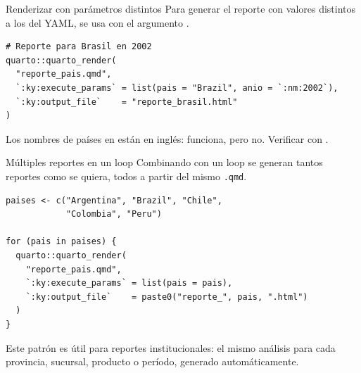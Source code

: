 \documentclass[8pt]{beamer}
\begin{document}
	\begin{frame}[fragile]{Renderizar con parámetros distintos}
		Para generar el reporte con valores distintos a los del YAML, se usa  con el argumento .

\begin{lstlisting}[style=RScript]
# Reporte para Brasil en 2002
quarto::quarto_render(
  "reporte_pais.qmd",
  `:ky:execute_params` = list(pais = "Brazil", anio = `:nm:2002`),
  `:ky:output_file`    = "reporte_brasil.html"
)
\end{lstlisting}

		\begin{alertblock}{}
			Los nombres de países en  están en inglés:  funciona, pero  no. Verificar con .
		\end{alertblock}
	\end{frame}


	\begin{frame}[fragile]{Múltiples reportes en un loop}
		Combinando  con un loop se generan tantos reportes como se quiera, todos a partir del mismo \texttt{.qmd}.

\begin{lstlisting}[style=RScript]
paises <- c("Argentina", "Brazil", "Chile",
            "Colombia", "Peru")

for (pais in paises) {
  quarto::quarto_render(
    "reporte_pais.qmd",
    `:ky:execute_params` = list(pais = pais),
    `:ky:output_file`    = paste0("reporte_", pais, ".html")
  )
}
\end{lstlisting}

		\begin{exampleblock}{}
			Este patrón es útil para reportes institucionales: el mismo análisis para cada provincia, sucursal, producto o período, generado automáticamente.
		\end{exampleblock}
	\end{frame}
\end{document}
